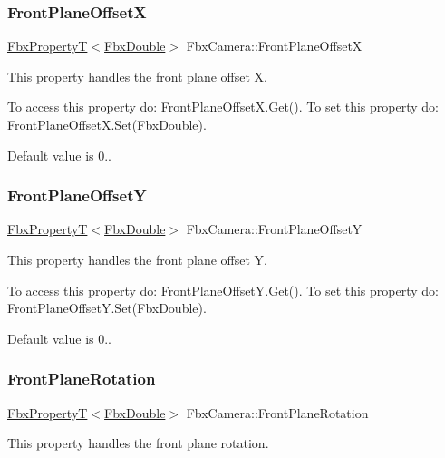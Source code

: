 \subsubsection{\texorpdfstring{Front\+Plane\+OffsetX}{FrontPlaneOffsetX}}
{\footnotesize\ttfamily \hyperlink{class_fbx_property_t}{Fbx\+PropertyT}$<$\hyperlink{fbxtypes_8h_a171e72a1c46fc15c1a6c9c31948c1c5b}{Fbx\+Double}$>$ Fbx\+Camera\+::\+Front\+Plane\+OffsetX}

This property handles the front plane offset X.

To access this property do\+: Front\+Plane\+Offset\+X.\+Get(). To set this property do\+: Front\+Plane\+Offset\+X.\+Set(\+Fbx\+Double).

Default value is 0.. \mbox{\label{class_fbx_camera_acf005c234e34ef2b44fadf4db42be655}} 
\subsubsection{\texorpdfstring{Front\+Plane\+OffsetY}{FrontPlaneOffsetY}}
{\footnotesize\ttfamily \hyperlink{class_fbx_property_t}{Fbx\+PropertyT}$<$\hyperlink{fbxtypes_8h_a171e72a1c46fc15c1a6c9c31948c1c5b}{Fbx\+Double}$>$ Fbx\+Camera\+::\+Front\+Plane\+OffsetY}

This property handles the front plane offset Y.

To access this property do\+: Front\+Plane\+Offset\+Y.\+Get(). To set this property do\+: Front\+Plane\+Offset\+Y.\+Set(\+Fbx\+Double).

Default value is 0.. \mbox{\label{class_fbx_camera_ac50922c82f1509c5f4f9e5c328ede671}} 
\subsubsection{\texorpdfstring{Front\+Plane\+Rotation}{FrontPlaneRotation}}
{\footnotesize\ttfamily \hyperlink{class_fbx_property_t}{Fbx\+PropertyT}$<$\hyperlink{fbxtypes_8h_a171e72a1c46fc15c1a6c9c31948c1c5b}{Fbx\+Double}$>$ Fbx\+Camera\+::\+Front\+Plane\+Rotation}

This property handles the front plane rotation.

